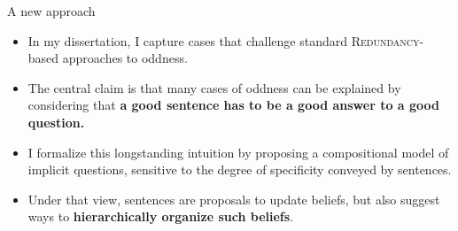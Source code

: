 \documentclass[10pt]{beamer}
\begin{document}
\begin{frame}{A new approach}
	\begin{itemize}
		\item In my dissertation, I capture cases that challenge standard \textsc{Redundancy}-based approaches to oddness.
		\item The central claim is that many cases of oddness can be explained by considering that \textbf{a good sentence has to be a good answer to a good question.}
		\item I formalize this longstanding intuition by proposing a compositional model of implicit questions, sensitive to the degree of specificity conveyed by sentences.
		\item Under that view, sentences are proposals to update beliefs, but also suggest ways to \textbf{hierarchically organize such beliefs}.
	\end{itemize}
\end{frame}

\end{document}

